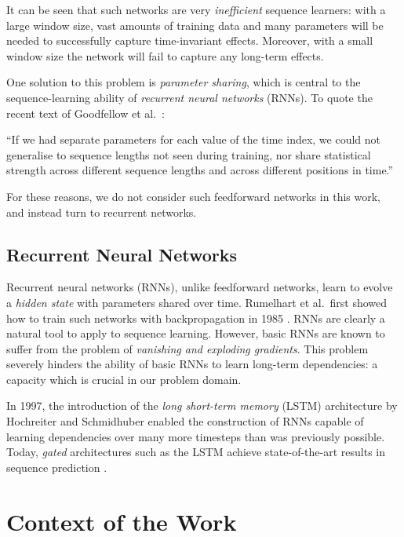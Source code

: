 \documentclass[12pt,a4paper,twoside,openright]{report}
\begin{document}
It can be seen that such networks are very \emph{inefficient} sequence learners:
with a large window size, vast amounts of training data and many parameters will
be needed to successfully capture time-invariant effects. Moreover, with a small
window size the network will fail to capture any long-term effects.

One solution to this problem is \emph{parameter sharing}, which is central to
the sequence-learning ability of \emph{recurrent neural networks} (RNNs). To
quote the recent text of Goodfellow et al.\ \cite{Goodfellow-et-al-2016}:
\begin{displayquote}
  ``If we had separate parameters for each value of the time index, we could not
  generalise to sequence lengths not seen during training, nor share statistical
  strength across different sequence lengths and across diﬀerent positions in
  time.''
\end{displayquote}

For these reasons, we do not consider such feedforward networks in this work,
and instead turn to recurrent networks.

\subsection{Recurrent Neural Networks}

Recurrent neural networks (RNNs), unlike feedforward networks, learn to evolve a
\emph{hidden state} with parameters shared over time. Rumelhart et al.\ first
showed how to train such networks with backpropagation in 1985
\cite{rumelhart1985learning}. RNNs are clearly a natural tool to apply to
sequence learning. However, basic RNNs are known to suffer from the problem of
\emph{vanishing and exploding gradients}. This problem severely hinders the
ability of basic RNNs to learn long-term dependencies: a capacity which is
crucial in our problem domain.

In 1997, the introduction of the \emph{long short-term memory} (LSTM)
architecture by Hochreiter and Schmidhuber \cite{hochreiter1997long} enabled the
construction of RNNs capable of learning dependencies over many more timesteps
than was previously possible. Today, \emph{gated} architectures such as the LSTM
achieve state-of-the-art results in sequence prediction \cite{zaremba2014recurrent}.

\section{Context of the Work}\label{sec:context-of-work}
\end{document}
